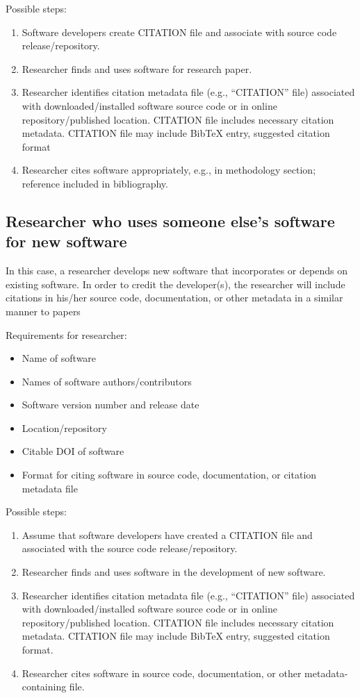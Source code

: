 \documentclass[12pt, oneside]{amsart}
\begin{document}
Possible steps:
\begin{enumerate} \setcounter{enumi}{0}
\item Software developers create CITATION file and associate with source code release/repository.
\item Researcher finds and uses software for research paper.
\item Researcher identifies citation metadata file (e.g., ``CITATION'' file) associated with downloaded/installed software source code or in online repository/published location. CITATION file includes necessary citation metadata. CITATION file may include BibTeX entry, suggested citation format
\item Researcher cites software appropriately, e.g., in methodology section; reference included in bibliography.
\end{enumerate}

\subsection{Researcher who uses someone else's software for new software}

In this case, a researcher develops new software that incorporates or depends on existing software.
In order to credit the developer(s), the researcher will include citations in his/her source code, documentation, or other metadata in a similar manner to papers

Requirements for researcher:
\begin{itemize}
\item Name of software
\item Names of software authors/contributors
\item Software version number and release date
\item Location/repository
\item Citable DOI of software
\item Format for citing software in source code, documentation, or citation metadata file
\end{itemize}

Possible steps:
\begin{enumerate} \setcounter{enumi}{0}
\item Assume that software developers have created a CITATION file and associated with the source code release/repository.
\item Researcher finds and uses software in the development of new software.
\item Researcher identifies citation metadata file (e.g., ``CITATION'' file) associated with downloaded/installed software source code or in online repository/published location. CITATION file includes necessary citation metadata. CITATION file may include BibTeX entry, suggested citation format.
\item Researcher cites software in source code, documentation, or other metadata-containing file.
\end{enumerate}
\end{document}
